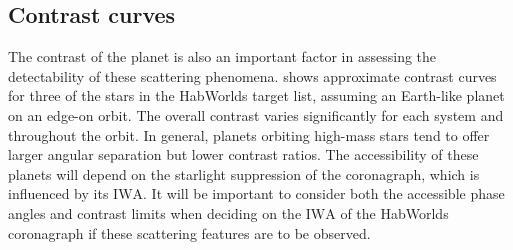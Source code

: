 \documentclass[usenatbib]{mnras}
\newcommand{\IWA}{\ensuremath{\mathrm{IWA}}\xspace}
\newcommand{\HWO}{HabWorlds\xspace}
\begin{document}
\begin{table}
    \centering
    \caption{
        The expected number of targets for which the peak phase angle of each phenomenon would be detectable when assuming randomly inclined, eccentric orbits (see \cref{sec:eccentric}).
        For reference, the \HWO target list consists of 164 targets in total.
    }
    \label{tab:nstars_detect}
    
\end{table}

\subsection{Contrast curves}
\label{sec:results_contrast}

The contrast of the planet is also an important factor in assessing the detectability of these scattering phenomena. 
%
 shows approximate contrast curves for three of the stars in the \HWO target list, assuming an Earth-like planet on an edge-on orbit.
%
The overall contrast varies significantly for each system and throughout the orbit. 
%
In general, planets orbiting high-mass stars tend to offer larger angular separation but lower contrast ratios. 
%
The accessibility of these planets will depend on the starlight suppression of the coronagraph, which is influenced by its \IWA.
%
It will be important to consider both the accessible phase angles and contrast limits when deciding on the \IWA of the \HWO coronagraph if these scattering features are to be observed.
\end{document}
